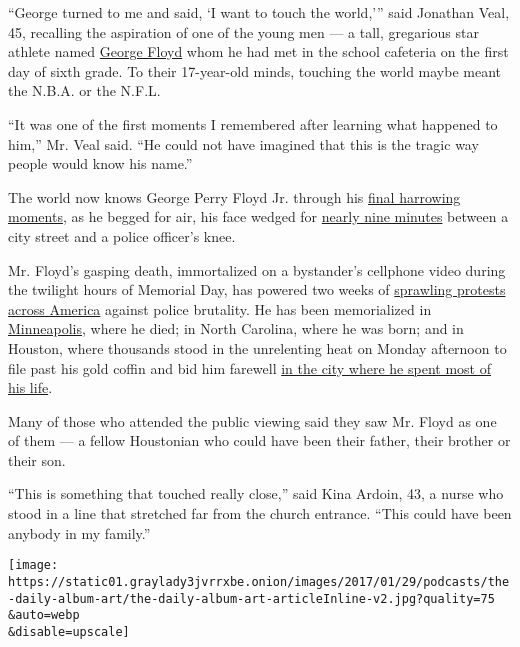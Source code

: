 ``George turned to me and said, `I want to touch the world,''' said
Jonathan Veal, 45, recalling the aspiration of one of the young men ---
a tall, gregarious star athlete named
\href{https://www.nytimes3xbfgragh.onion/2020/06/10/podcasts/the-daily/george-floyd-protests-funeral.html}{George
Floyd} whom he had met in the school cafeteria on the first day of sixth
grade. To their 17-year-old minds, touching the world maybe meant the
N.B.A. or the N.F.L.

``It was one of the first moments I remembered after learning what
happened to him,'' Mr. Veal said. ``He could not have imagined that this
is the tragic way people would know his name.''

The world now knows George Perry Floyd Jr. through his
\href{https://www.nytimes3xbfgragh.onion/2020/05/29/us/derek-chauvin-george-floyd-worked-together.html}{final
harrowing moments}, as he begged for air, his face wedged for
\href{https://www.nytimes3xbfgragh.onion/2020/05/31/us/george-floyd-investigation.html}{nearly
nine minutes} between a city street and a police officer's knee.

Mr. Floyd's gasping death, immortalized on a bystander's cellphone video
during the twilight hours of Memorial Day, has powered two weeks of
\href{https://www.nytimes3xbfgragh.onion/news-event/george-floyd-protests-minneapolis-new-york-los-angeles}{sprawling
protests across America} against police brutality. He has been
memorialized in
\href{https://www.nytimes3xbfgragh.onion/2020/07/29/us/george-floyd-memorial.html}{Minneapolis},
where he died; in North Carolina, where he was born; and in Houston,
where thousands stood in the unrelenting heat on Monday afternoon to
file past his gold coffin and bid him farewell
\href{https://www.nytimes3xbfgragh.onion/2020/06/08/us/george-floyd-viewing-funeral-houston-unrest.html}{in
the city where he spent most of his life}.

Many of those who attended the public viewing said they saw Mr. Floyd as
one of them --- a fellow Houstonian who could have been their father,
their brother or their son.

``This is something that touched really close,'' said Kina Ardoin, 43, a
nurse who stood in a line that stretched far from the church entrance.
``This could have been anybody in my family.''

\texttt{[image: https://static01.graylady3jvrrxbe.onion/images/2017/01/29/podcasts/the-daily-album-art/the-daily-album-art-articleInline-v2.jpg?quality=75\\\&auto=webp\\\&disable=upscale]}

